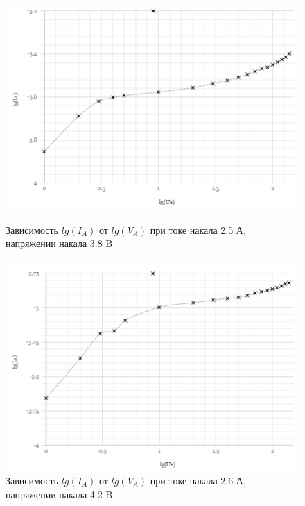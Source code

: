 \documentclass[a4paper]{article}
\begin{document}
\begin{figure}[h]
\begin{center}
\begin{minipage}[h]{0.45\linewidth}
\includegraphics[width=1\linewidth]{2_5.PNG}
\caption{Зависимость $lg(I_A)$ от $lg(V_A)$ при токе накала 2.5 А, напряжении накала 3.8 B} %
\end{minipage}
\hfill 
\begin{minipage}[h]{0.45\linewidth}
\includegraphics[width=1\linewidth]{2_6.PNG}
\caption{Зависимость $lg(I_A)$ от $lg(V_A)$ при токе накала 2.6 А, напряжении накала 4.2 B }
\label{ris:experimcoded}
\end{minipage}
\end{center}
\end{figure}
\end{document}
